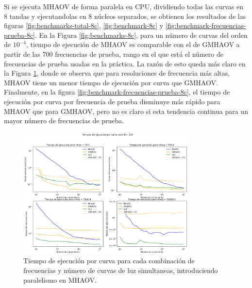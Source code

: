 Si se ejecuta MHAOV de forma paralela en CPU, dividiendo todas las curvas en 8 tandas y ejecutandolas en 8 núcleos separados, se obtienen los resultados de las figuras \ref{fig:benchmarks-total-8c}, \ref{fig:benchmark-8c} y \ref{fig:benchmark-frecuencias-prueba-8c}. En la Figura \ref{fig:benchmarks-8c}, para un número de curvas del orden de $10^{-4}$, tiempo de ejecución de MHAOV es comparable con el de GMHAOV a partir de las 700 frecuencias de prueba, rango en el que está el número de frecuencias de prueba usadas en la práctica. La razón de esto queda más claro en la Figura \ref{fig:benchmarks-por-curva-8c}, donde se observa que para resoluciones de frecuencia más altas, MHAOV tiene un menor tiempo de ejecución por curva que GMHAOV. Finalmente, en la figura \ref{fig:benchmark-frecuencias-prueba-8c}, el tiempo de ejecución por curva por frecuencia de prueba disminuye más rápido para MHAOV que para GMHAOV, pero no es claro si esta tendencia continua para un mayor número de frecuencias de prueba.
\begin{figure}[h]

    \centering
    \includegraphics[width=0.8\textwidth]{figs/benchmarks-8c.png}
    \caption{Tiempo de ejecución por curva para cada combinación de frecuencias y número de curvas de luz simultaneas, introduciendo paralelismo en MHAOV.}
    \label{fig:benchmarks-por-curva-8c}
\end{figure}

